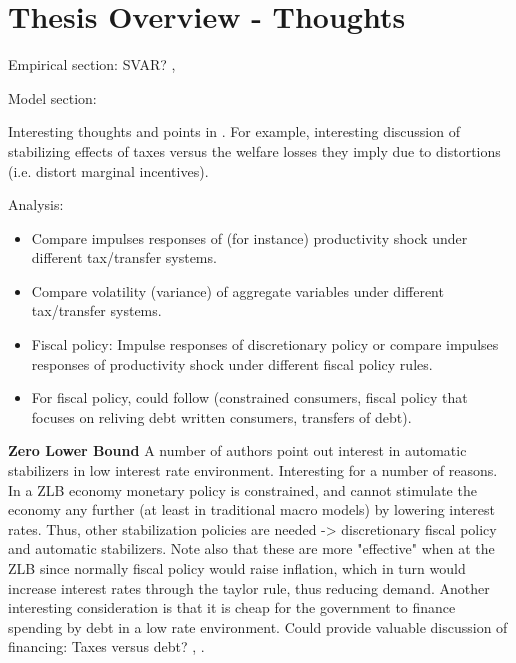 





\section{Thesis Overview - Thoughts}


Empirical section: 
SVAR? 
\citet{blanchard2002empirical}, \citet{dolado1997causes}

Model section: 





Interesting thoughts and points in \citet{andersen2016automatic}. For example, interesting discussion of stabilizing effects of taxes versus the welfare losses they imply due to distortions (i.e. distort marginal incentives). 

Analysis: 
\begin{itemize}  
           \item Compare impulses responses of (for instance) productivity shock under different tax/transfer systems. 
           \item Compare volatility (variance) of aggregate variables under different tax/transfer systems. 
           \item Fiscal policy: Impulse responses of discretionary policy or compare impulses responses of productivity shock under different fiscal policy rules. 
           \item For fiscal policy, could follow \citet{eggertsson2012debt} (constrained consumers, fiscal policy that focuses on reliving debt written consumers, transfers of debt).  
\end{itemize}



\textbf{Zero Lower Bound}
A number of authors point out interest in automatic stabilizers in low interest rate environment. Interesting for a number of reasons. In a ZLB economy monetary policy is constrained, and cannot stimulate the economy any further (at least in traditional macro models) by lowering interest rates. Thus, other stabilization policies are needed -> discretionary fiscal policy and automatic stabilizers. Note also that these are more "effective" when at the ZLB since normally fiscal policy would raise inflation, which in turn would increase interest rates through the taylor rule, thus reducing demand. 
Another interesting consideration is that it is cheap for the government to finance spending by debt in a low rate environment. Could provide valuable discussion of financing: Taxes versus debt? \citet{blanchard2019public}, \citet{blanchard2020automatic}.



